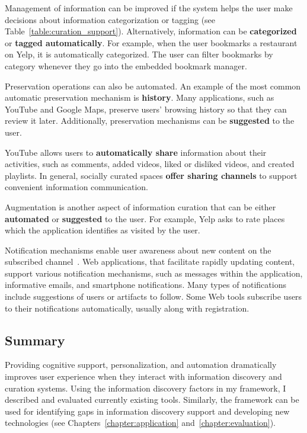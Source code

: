{{Management of information can be improved if the system helps the user make decisions about information categorization or tagging (see Table~\ref{table:curation_support}). Alternatively, information can be \textbf{categorized} or \textbf{tagged automatically}. For example, when the user bookmarks a restaurant on Yelp, it is automatically categorized. The user can filter bookmarks by category whenever they go into the embedded bookmark manager. 

Preservation operations can also be automated. An example of the most common automatic preservation mechanism is \textbf{history}. Many applications, such as YouTube and Google Maps, preserve users' browsing history so that they can review it later. Additionally, preservation mechanisms can be \textbf{suggested} to the user.

YouTube allows users to \textbf{automatically share} information about their activities, such as comments,  added videos, liked or disliked videos, and created playlists. In general, socially curated spaces \textbf{offer sharing channels} to support convenient information communication.
 
Augmentation is another aspect of information curation that can be either \textbf{automated} or \textbf{suggested} to the user. For example, Yelp asks to rate places which the application identifies as visited by the user. 

Notification mechanisms enable user awareness about new content on the subscribed channel~\cite{millen2005social}. Web applications, that facilitate rapidly updating content, support various notification mechanisms, such as messages within the application, informative emails, and smartphone notifications. Many types of notifications include suggestions of users or artifacts to follow. Some Web tools subscribe users to their notifications automatically, usually along with registration.
} %
{\subsection{Summary}
Providing cognitive support, personalization, and automation dramatically improves user experience when they interact with information discovery and curation systems. Using the information discovery factors in my framework, I described and evaluated currently existing tools. Similarly, the framework can be used for identifying gaps in information discovery support and developing new technologies (see Chapters~\ref{chapter:application} and~\ref{chapter:evaluation}).  
}
}






